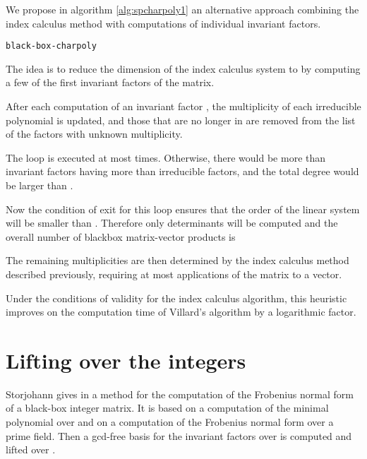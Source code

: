 \documentclass{article}
\begin{document}
We propose in algorithm \ref{alg:spcharpoly1} an alternative approach combining
the index calculus method with computations of individual
invariant factors. 

\begin{algorithm}
  \dontprintsemicolon
  \caption{\texttt{black-box-charpoly} \label{alg:spcharpoly1}}
\end{algorithm}


The idea is to reduce the dimension of the index calculus system to  
by computing a few of the first invariant factors of the matrix.

After each computation of an invariant factor , the multiplicity of
each irreducible polynomial  is updated, and those  that are no longer
in  are removed from the list of the factors with unknown multiplicity.

The  loop is executed at most  times. Otherwise, there
would be more than  invariant factors having more than 
irreducible factors, and the total degree would be larger than .

Now the condition of exit for this loop ensures that the order of the
linear system will be smaller than . Therefore only 
determinants will be computed and the overall number of blackbox matrix-vector products 
is 

The remaining multiplicities are then determined by the
index calculus method  described previously,
requiring at most  applications of the matrix to a vector.

Under the conditions of validity for the index calculus algorithm, this
heuristic improves on the computation time of Villard's algorithm by a logarithmic factor.

\section{Lifting over the integers}\label{sec:spint}

Storjohann gives in \cite{Storjohann:2000:Frob} a method for the
computation of the Frobenius normal form of a black-box integer
matrix. It is based on a computation of the minimal polynomial over
 and on a computation of the Frobenius normal form over a prime
field. Then a gcd-free basis for the invariant factors over 
is computed and lifted over . 
\end{document}
